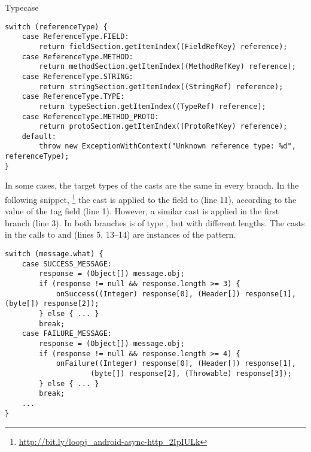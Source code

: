 \begin{pattern}{Typecase}
\begin{verbatim}
switch (referenceType) {
    case ReferenceType.FIELD:
        return fieldSection.getItemIndex((FieldRefKey) reference);
    case ReferenceType.METHOD:
        return methodSection.getItemIndex((MethodRefKey) reference);
    case ReferenceType.STRING:
        return stringSection.getItemIndex((StringRef) reference);
    case ReferenceType.TYPE:
        return typeSection.getItemIndex((TypeRef) reference);
    case ReferenceType.METHOD_PROTO:
        return protoSection.getItemIndex((ProtoRefKey) reference);
    default:
        throw new ExceptionWithContext("Unknown reference type: %d",  referenceType);
}
\end{verbatim}

In some cases, the target types of the casts are the same in every branch.
In the following snippet,%
\footnote{\url{http://bit.ly/loopj_android-async-http_2IpIULk}}
the cast is applied to the  field to (line 11),
according to the value of the tag  field (line 1).
However, a similar cast is applied in the first branch (line 3).
In both branches  is of type ,
  but with different lengths.
  The casts in the calls to  and
   (lines 5, 13--14) are instances of the
   pattern.

\begin{verbatim}
switch (message.what) {
    case SUCCESS_MESSAGE:
        response = (Object[]) message.obj;
        if (response != null && response.length >= 3) {
            onSuccess((Integer) response[0], (Header[]) response[1], (byte[]) response[2]);
        } else { ... }
        break;
    case FAILURE_MESSAGE:
        response = (Object[]) message.obj;
        if (response != null && response.length >= 4) {
            onFailure((Integer) response[0], (Header[]) response[1],
                    (byte[]) response[2], (Throwable) response[3]);
        } else { ... }
        break;
    ...
}
\end{verbatim}


\end{pattern}

